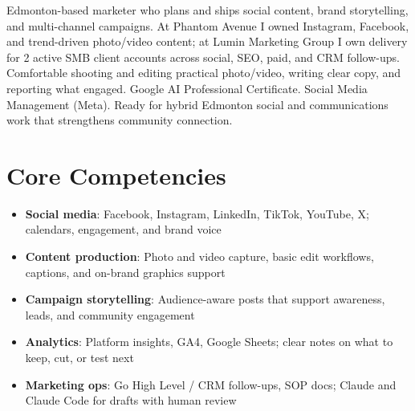 \documentclass[11pt,a4paper,sans]{moderncv}
\begin{document}
\makecvtitle

\vspace{6pt}
\small{Edmonton-based marketer who plans and ships social content, brand storytelling, and multi-channel campaigns. At Phantom Avenue I owned Instagram, Facebook, and trend-driven photo/video content; at Lumin Marketing Group I own delivery for 2 active SMB client accounts across social, SEO, paid, and CRM follow-ups. Comfortable shooting and editing practical photo/video, writing clear copy, and reporting what engaged. Google AI Professional Certificate. Social Media Management (Meta). Ready for hybrid Edmonton social and communications work that strengthens community connection.}

\section{Core Competencies}
\vspace{1pt}
\begin{itemize}
\item \textbf{Social media}: Facebook, Instagram, LinkedIn, TikTok, YouTube, X; calendars, engagement, and brand voice
\item \textbf{Content production}: Photo and video capture, basic edit workflows, captions, and on-brand graphics support
\item \textbf{Campaign storytelling}: Audience-aware posts that support awareness, leads, and community engagement
\item \textbf{Analytics}: Platform insights, GA4, Google Sheets; clear notes on what to keep, cut, or test next
\item \textbf{Marketing ops}: Go High Level / CRM follow-ups, SOP docs; Claude and Claude Code for drafts with human review
\end{itemize}
\end{document}
